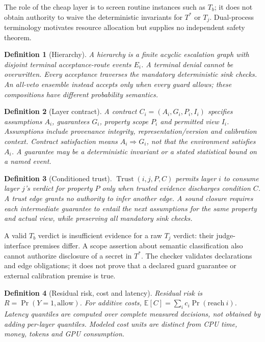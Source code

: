 \documentclass[lettersize,journal]{IEEEtran}
\newtheorem{definition}{Definition}
\begin{document}
The role of the cheap layer is to screen routine instances such as $T_b$; it
does not obtain authority to waive the deterministic invariants for $T^*$ or
$T_j$. Dual-process terminology motivates resource allocation but supplies no
independent safety theorem.

\begin{definition}[Hierarchy]
A hierarchy is a finite acyclic escalation graph with disjoint terminal
acceptance-route events $E_i$. A terminal denial cannot be overwritten. Every
acceptance traverses the mandatory deterministic sink checks. An all-veto
ensemble instead accepts only when every guard allows; these compositions have
different probability semantics.
\end{definition}

\begin{definition}[Layer contract]
A contract $C_i=(A_i,G_i,P_i,I_i)$ specifies assumptions $A_i$, guarantees
$G_i$, property scope $P_i$ and permitted view $I_i$. Assumptions include
provenance integrity, representation/version and calibration context. Contract
satisfaction means $A_i\Rightarrow G_i$, not that the environment satisfies
$A_i$. A guarantee may be a deterministic invariant or a stated statistical
bound on a named event.
\end{definition}

\begin{definition}[Conditioned trust]
$\operatorname{Trust}(i,j,P,C)$ permits layer $i$ to consume layer $j$'s
verdict for property $P$ only when trusted evidence discharges condition $C$.
A trust edge grants no authority to infer another edge. A sound closure
requires each intermediate guarantee to entail the next assumptions for the
same property and actual view, while preserving all mandatory sink checks.
\end{definition}

A valid $T_b$ verdict is insufficient evidence for a raw $T_j$ verdict:
their judge-interface premises differ. A scope assertion about semantic
classification also cannot authorize disclosure of a secret in $T^*$.
The checker validates declarations and edge obligations; it does not prove
that a declared guard guarantee or external calibration premise is true.

\begin{definition}[Residual risk, cost and latency]
Residual risk is $R=\Pr(Y=1,\mathrm{allow})$. For additive costs,
$\mathbb{E}[C]=\sum_i c_i\Pr(\mathrm{reach}\ i)$.
Latency quantiles are computed over complete measured decisions, not obtained
by adding per-layer quantiles. Modeled cost units are distinct from CPU time,
money, tokens and GPU consumption.
\end{definition}
\end{document}
